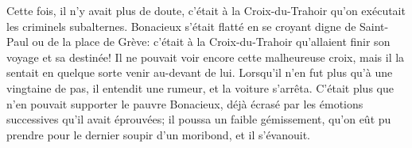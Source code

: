 Cette fois, il n'y avait plus de doute, c'était à la Croix-du-Trahoir qu'on exécutait les criminels subalternes. Bonacieux s'était flatté en se croyant digne de Saint-Paul ou de la place de Grève: c'était à la Croix-du-Trahoir qu'allaient finir son voyage et sa destinée! Il ne pouvait voir encore cette malheureuse croix, mais il la sentait en quelque sorte venir au-devant de lui. Lorsqu'il n'en fut plus qu'à une vingtaine de pas, il entendit une rumeur, et la voiture s'arrêta. C'était plus que n'en pouvait supporter le pauvre Bonacieux, déjà écrasé par les émotions successives qu'il avait éprouvées; il poussa un faible gémissement, qu'on eût pu prendre pour le dernier soupir d'un moribond, et il s'évanouit.